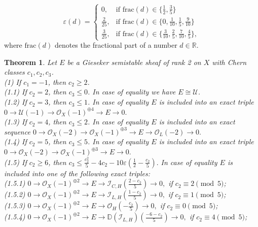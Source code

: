 \documentclass{amsart}
\newtheorem{theorem}{Theorem}[section]
\begin{document}
	\begin{equation}\label{error}
		\varepsilon(d)=
		\begin{cases}
			0, & \text{if } \mathrm{frac}(d)\in\{\frac 12,\frac 35\}\\
			\frac{2}{25}, & \text{if } \mathrm{frac}(d)\in\{0,\frac{1}{10},\frac 15,\frac{9}{10}\}\\
			\frac{3}{25}, & \text{if } \mathrm{frac}(d)\in\{\frac{3}{10},\frac 25,\frac{7}{10},\frac 45\},
		\end{cases}
	\end{equation}
	where $\mathrm{frac}(d)$ denotes the fractional part of a number $d\in\mathbb R$.
		
	\begin{theorem}\label{intro}Let $E$ be a Gieseker semistable sheaf of rank 2 on $X$ with Chern classes $c_1,c_2,c_3$. \\
	(1) If $c_1=-1$, then $c_2\ge 2$. \\
	(1.1) If $c_2=2$, then $c_3\le 0$. In case of equality we have $E\cong\mathcal U$. \\
	(1.2) If $c_2=3$, then $c_3\le 1$. In case of equality $E$ is included into an exact triple $0\to \mathcal U(-1)\to\mathcal O_X(-1)^{\oplus 4}\to E\to 0.$ \\
	(1.3) If $c_2=4$, then $c_3\le 2$. In case of equality $E$ is included into an exact sequence
	$0\to\mathcal O_X(-2)\to\mathcal O_X(-1)^{\oplus 3}\to E\to\mathcal O_L(-2)\to 0.$ \\
	(1.4) If $c_2=5$, then $c_3\le 5$. In case of equality $E$ is included into an exact triple $0\to \mathcal O_X(-2)\to\mathcal O_X(-1)^{\oplus 3}\to E\to 0.$ \\
	(1.5) If $c_2\ge 6$, then $c_3\le\frac{c_2^2}{5}-4c_2-10\varepsilon(\frac 12-\frac{c_2}{5}).$
	In case of equality $E$ is included into one of the following exact triples:\\
	(1.5.1) $0\to \mathcal O_X(-1)^{\oplus 2}\to E\to\mathcal I_{C,H}(\frac{2-c_2}{5})\to 0,$ if $c_2 \equiv 2 \pmod 5$;\\
	(1.5.2) $0\to \mathcal O_X(-1)^{\oplus 2}\to E\to\mathcal I_{L,H}(\frac{1-c_2}{5})\to 0,$ if $c_2 \equiv 1 \pmod 5$;\\
	(1.5.3) $0\to \mathcal O_X(-1)^{\oplus 2}\to E\to\mathcal O_H(-\frac{c_2}{5})\to 0,$ if $c_2 \equiv 0 \pmod 5$;\\
	(1.5.4) $0\to \mathcal O_X(-1)^{\oplus 2}\to E\to \mathbb D(\mathcal I_{L,H})(\frac{-6-c_2}{5})\to 0,$ if $c_2 \equiv 4 \pmod 5$;\\

\end{theorem}
\end{document}
